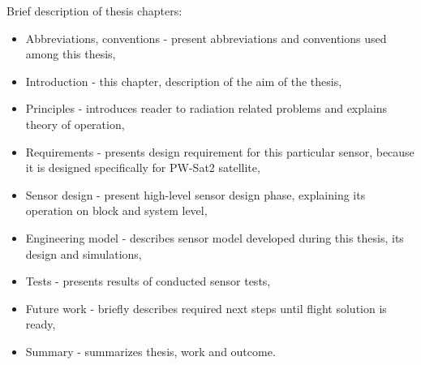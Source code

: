     Brief description of thesis chapters:
    \begin{itemize}
        \item Abbreviations, conventions - present abbreviations and conventions used among this thesis,
        \item Introduction - this chapter, description of the aim of the thesis,
        \item Principles - introduces reader to radiation related problems and explains theory of operation,
        \item Requirements - presents design requirement for this particular sensor, because it is designed specifically for PW-Sat2 satellite,
        \item Sensor design - present high-level sensor design phase, explaining its operation on block and system level,
        \item Engineering model - describes sensor model developed during this thesis, its design and simulations,
        \item Tests - presents results of conducted sensor tests,
        \item Future work - briefly describes required next steps until flight solution is ready,
        \item Summary - summarizes thesis, work and outcome.
    \end{itemize}

    
